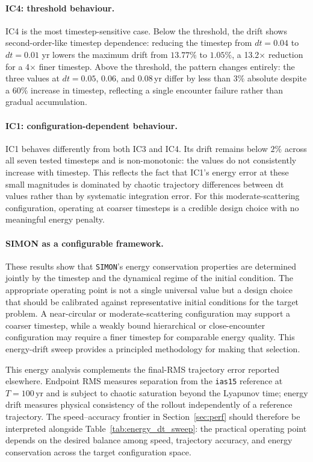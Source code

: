 \documentclass[12pt]{article}
\begin{document}
\paragraph{IC4: threshold behaviour.}
IC4 is the most timestep-sensitive case. Below the threshold, the drift shows second-order-like timestep dependence:
reducing the timestep from $dt = 0.04$ to $dt = 0.01$ yr lowers the maximum
drift from $13.77\%$ to $1.05\%$, a 13.2× reduction for a 4× finer timestep. Above the
threshold, the pattern changes entirely: the three values at
$dt=0.05$, $0.06$, and $0.08$\,yr differ by less than $3\%$ absolute
despite a $60\%$ increase in timestep, reflecting a single
encounter failure rather than gradual accumulation.

\paragraph{IC1: configuration-dependent behaviour.}
IC1 behaves differently from both IC3 and IC4. Its drift remains
below $2\%$ across all seven tested timesteps and is non-monotonic:
the values do not consistently increase with timestep. This reflects
the fact that IC1's energy error at these small magnitudes is
dominated by chaotic trajectory differences between dt values rather
than by systematic integration error. For this moderate-scattering
configuration, operating at coarser timesteps is a credible design
choice with no meaningful energy penalty.

\paragraph{SIMON as a configurable framework.}
These results show that \texttt{SIMON}'s energy conservation properties are
determined jointly by the timestep and the dynamical regime of the
initial condition. The appropriate operating point is not a single
universal value but a design choice that should be calibrated against
representative initial conditions for the target problem. A
near-circular or moderate-scattering configuration may support a
coarser timestep, while a weakly bound hierarchical or
close-encounter configuration may require a finer timestep for
comparable energy quality. This energy-drift sweep provides a
principled methodology for making that selection.

This energy analysis complements the final-RMS trajectory error
reported elsewhere. Endpoint RMS measures separation from the
\texttt{ias15} reference at $T=100$\,yr and is subject to chaotic
saturation beyond the Lyapunov time; energy drift measures physical
consistency of the rollout independently of a reference trajectory.
The speed--accuracy frontier in Section~\ref{sec:perf} should
therefore be interpreted alongside
Table~\ref{tab:energy_dt_sweep}: the practical operating point
depends on the desired balance among speed, trajectory accuracy, and
energy conservation across the target configuration space.
\end{document}
